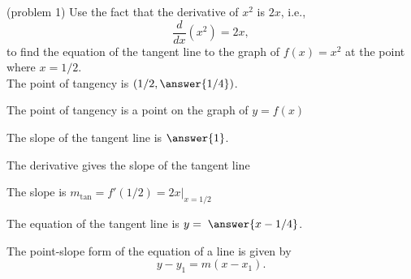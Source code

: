 \documentclass{ximera}
\begin{document}
\begin{problem}(problem 1)
Use the fact that the derivative of $x^2$ is $2x$,
i.e., 
\[
\frac{d}{dx}\left( x^2 \right) = 2x,
\]
to find the equation of the tangent line to the graph of 
$f(x) = x^2$ at the point where $x = 1/2$.\\

The point of tangency is $(1/2, \answer{1/4})$.\\

\begin{hint}
The point of tangency is a point on the graph of $y = f(x)$
\end{hint}


The slope of the tangent line is $\answer{1}$.\\
\begin{hint}
The derivative gives the slope of the tangent line
\end{hint}
\begin{hint}
The slope is $m_{\text{tan}} = f'(1/2) = 2x\big|_{x=1/2}$
\end{hint}


The equation of the tangent line is $y = \; \answer{x - 1/4}$.
\begin{hint}
The point-slope form of the equation of a line is given by
\[
 y - y_1 = m(x - x_1).
 \]
 \end{hint}
 
\end{problem}




\end{document}
